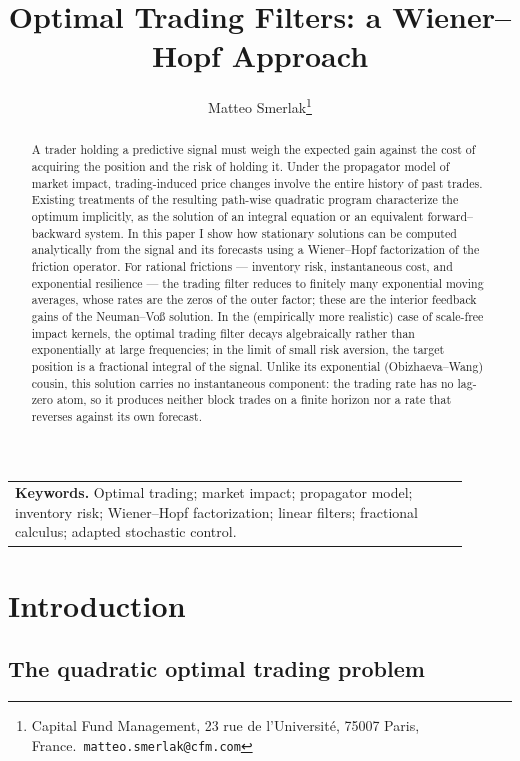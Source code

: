 \documentclass[11pt]{article}
\title{Optimal Trading Filters: a Wiener--Hopf Approach}
\author{Matteo Smerlak\thanks{Capital Fund Management, 23 rue de l'Universit\'e, 75007 Paris, France.\ \texttt{matteo.smerlak@cfm.com}}}
\date{}
\theoremstyle{plain}
\theoremstyle{definition}
\theoremstyle{remark}
\begin{document}
\maketitle

\begin{center}
\begin{tabular}{p{0.9\linewidth}}
\textbf{Keywords.} Optimal trading; market impact; propagator model; inventory risk; Wiener--Hopf factorization; linear filters; fractional calculus; adapted stochastic control.\\[2pt]
\end{tabular}
\end{center}

\begin{abstract}
A trader holding a predictive signal must weigh the expected gain against the cost of acquiring the position and the risk of holding it. Under the propagator model of market impact, trading-induced price changes involve the entire history of past trades. Existing treatments of the resulting path-wise quadratic program characterize the optimum implicitly, as the solution of an integral equation or an equivalent forward--backward system. In this paper I show how stationary solutions can be computed analytically from the signal and its forecasts using a Wiener--Hopf factorization of the friction operator. For rational frictions --- inventory risk, instantaneous cost, and exponential resilience --- the trading filter reduces to finitely many exponential moving averages, whose rates are the zeros of the outer factor; these are the interior feedback gains of the Neuman--Vo\ss{} solution. In the (empirically more realistic) case of scale-free impact kernels, the optimal trading filter decays algebraically rather than exponentially at large frequencies; in the limit of small risk aversion, the target position is a fractional integral of the signal. Unlike its exponential (Obizhaeva--Wang) cousin, this solution carries no instantaneous component: the trading rate has no lag-zero atom, so it produces neither block trades on a finite horizon nor a rate that reverses against its own forecast.
\end{abstract}

\section{Introduction}\label{sec:intro}

\subsection{The quadratic optimal trading problem}\label{sec:problem}
\end{document}
